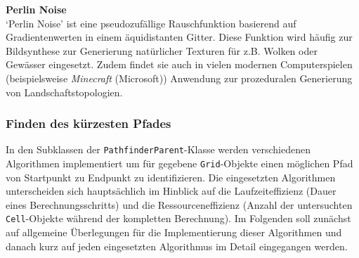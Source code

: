 \textbf{Perlin Noise}\\
`Perlin Noise' ist eine pseudozufällige Rauschfunktion basierend auf Gradientenwerten in einem äquidistanten Gitter.
Diese Funktion wird häufig zur Bildsynthese zur Generierung natürlicher Texturen für z.B. Wolken oder Gewässer eingesetzt.
Zudem findet sie auch in vielen modernen Computerspielen (beispielsweise \textit{Minecraft} (Microsoft)) Anwendung zur
prozeduralen Generierung von Landschaftstopologien.

\subsubsection{Finden des kürzesten Pfades}
In den Subklassen der \texttt{PathfinderParent}-Klasse werden verschiedenen Algorithmen implementiert um für gegebene
\texttt{Grid}-Objekte einen möglichen Pfad von Startpunkt zu Endpunkt zu identifizieren.
Die eingesetzten Algorithmen unterscheiden sich hauptsächlich im Hinblick auf die Laufzeiteffizienz (Dauer eines Berechnungsschritts)
und die Ressourceneffizienz (Anzahl der untersuchten \texttt{Cell}-Objekte während der kompletten Berechnung).
Im Folgenden soll zunächst auf allgemeine Überlegungen für die Implementierung dieser Algorithmen und danach kurz auf
jeden eingesetzten Algorithmus im Detail eingegangen werden.\\\\

